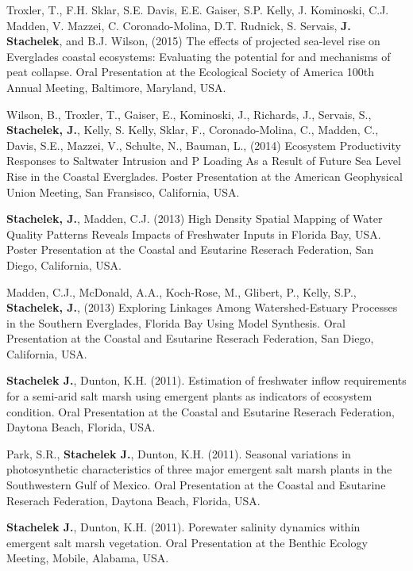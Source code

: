 \documentclass[10pt]{article}
\begin{document}
\begin{bibenum}
%   
    \item Troxler, T., F.H. Sklar, S.E. Davis, E.E. Gaiser, S.P. Kelly, J. Kominoski, C.J. Madden, V. Mazzei, C. Coronado-Molina, D.T. Rudnick, S. Servais, \textbf{J. Stachelek}, and B.J. Wilson, (2015) The effects of projected sea-level rise on Everglades coastal ecosystems: Evaluating the potential for and mechanisms of peat collapse. Oral Presentation at the Ecological Society of America 100th Annual Meeting, Baltimore, Maryland, USA. 
%   
    \item Wilson, B., Troxler, T., Gaiser, E., Kominoski, J., Richards, J., Servais, S., \textbf{Stachelek, J.}, Kelly, S. Kelly, Sklar, F., Coronado-Molina, C., Madden, C., Davis, S.E., Mazzei, V., Schulte, N., Bauman, L., (2014) Ecosystem Productivity Responses to Saltwater Intrusion and P Loading As a Result of Future Sea Level Rise in the Coastal Everglades. Poster Presentation at the American Geophysical Union Meeting, San Fransisco, California, USA.
   
    \item \textbf{Stachelek, J.}, Madden, C.J. (2013) High Density Spatial Mapping of Water Quality Patterns Reveals Impacts of Freshwater Inputs in Florida Bay, USA. Poster Presentation at the Coastal and Esutarine Reserach Federation, San Diego, California, USA.
   
    \item Madden, C.J., McDonald, A.A., Koch-Rose, M., Glibert, P., Kelly, S.P., \textbf{Stachelek, J.}, (2013) Exploring Linkages Among Watershed-Estuary Processes in the Southern Everglades, Florida Bay Using Model Synthesis. Oral Presentation at the Coastal and Esutarine Reserach Federation, San Diego, California, USA.
   
    \item \textbf{Stachelek J.}, Dunton, K.H. (2011). Estimation of freshwater inflow requirements for a semi-arid salt marsh using emergent plants as indicators of ecosystem condition. Oral Presentation at the Coastal and Esutarine Reserach Federation, Daytona Beach, Florida, USA.

    \item Park, S.R., \textbf{Stachelek J.}, Dunton, K.H. (2011). Seasonal variations in photosynthetic characteristics of three major emergent salt marsh plants in the Southwestern Gulf of Mexico. Oral Presentation at the Coastal and Esutarine Reserach Federation, Daytona Beach, Florida, USA.
 
    \item \textbf{Stachelek J.}, Dunton, K.H. (2011). Porewater salinity dynamics within emergent salt marsh vegetation. Oral Presentation at the Benthic Ecology Meeting, Mobile, Alabama, USA.

\end{bibenum}
\end{document}
